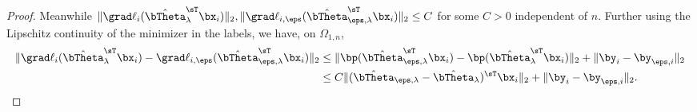 \begin{proof}
Meanwhile $\|\grad\ell_{i}(\hat\bTheta_{\lambda}^\sT\bx_i)\|_2,\|\grad\ell_{i,\eps}(\hat\bTheta_{\eps,\lambda}^\sT\bx_i)\|_2   \le C$ for some $C > 0$ independent of $n$.
Further using the  Lipschitz continuity of the minimizer in the labels, we have, on $\Omega_{1,n}$,
\begin{align}
\label{eq:grad_diff_to_y_diff}
 \|\grad\ell_{i}(\hat\bTheta_{\lambda}^\sT\bx_i) - \grad\ell_{i,\eps}(\hat\bTheta_{\eps,\lambda}^\sT\bx_i)\|_2  
 &\le \|\bp(\hat\bTheta_{\eps,\lambda}^\sT \bx_i) - \bp(\hat\bTheta_{\lambda}^\sT\bx_i)\|_2 + 
 \|\by_{i} - \by_{\eps,i}\|_2\\
 &\le C 
 \|(\hat\bTheta_{\eps,\lambda}- \hat\bTheta_{\lambda})^\sT\bx_i\|_2 +  
 \|\by_{i} - \by_{\eps,i}\|_2.
\end{align}



\end{proof}
